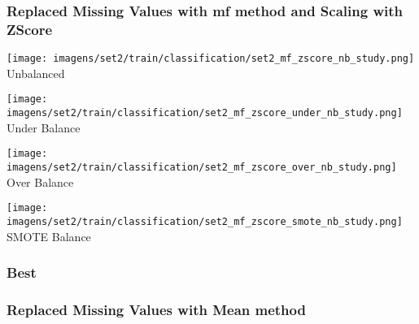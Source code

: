 \documentclass[11pt]{article}
\begin{document}
\subsubsection*{Replaced Missing Values with mf method and Scaling with ZScore}

\begin{figure*}[!htp]
    \begin{minipage}[!htp]{.25\textwidth}
        \centering
        \texttt{[image: imagens/set2/train/classification/set2\_mf\_zscore\_nb\_study.png]}
        Unbalanced
    \end{minipage}\hfill
    \begin{minipage}[!htp]{.25\textwidth}
        \centering
        \texttt{[image: imagens/set2/train/classification/set2\_mf\_zscore\_under\_nb\_study.png]}
        Under Balance
    \end{minipage}\hfill
    \begin{minipage}[!htp]{.25\textwidth}
        \centering
        \texttt{[image: imagens/set2/train/classification/set2\_mf\_zscore\_over\_nb\_study.png]}
        Over Balance
    \end{minipage}\hfill
    \begin{minipage}[!htp]{.25\textwidth}
        \centering
        \texttt{[image: imagens/set2/train/classification/set2\_mf\_zscore\_smote\_nb\_study.png]}
        SMOTE Balance
    \end{minipage}
\end{figure*}

\subsubsection*{Best}

\subsubsection{Replaced Missing Values with Mean method}
\end{document}
